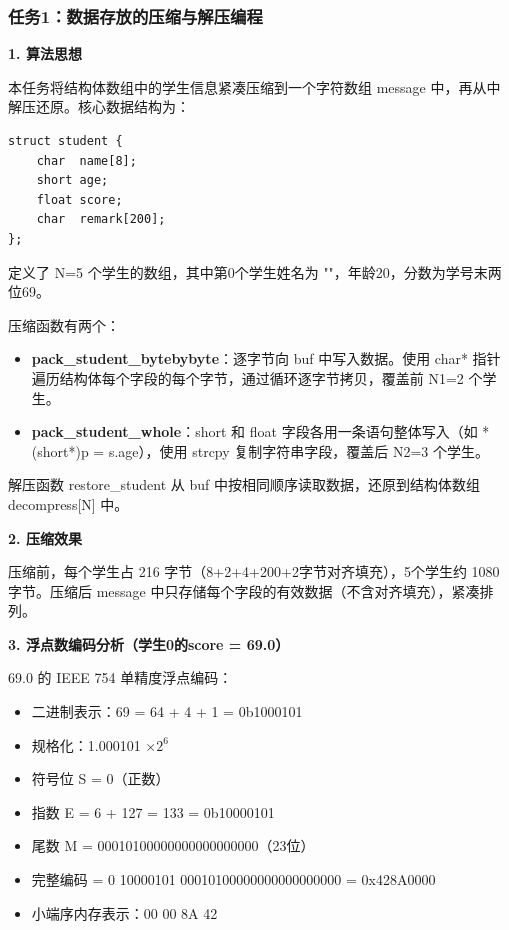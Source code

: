 \subsubsection*{任务1：数据存放的压缩与解压编程}

\textbf{1. 算法思想}

本任务将结构体数组中的学生信息紧凑压缩到一个字符数组 message 中，再从中解压还原。核心数据结构为：

\begin{lstlisting}
struct student {
    char  name[8];
    short age;
    float score;
    char  remark[200];
};
\end{lstlisting}

定义了 N=5 个学生的数组，其中第0个学生姓名为 "\studentname"，年龄20，分数为学号末两位69。

压缩函数有两个：
\begin{itemize}[nosep]
    \item \textbf{pack\_student\_bytebybyte}：逐字节向 buf 中写入数据。使用 char* 指针遍历结构体每个字段的每个字节，通过循环逐字节拷贝，覆盖前 N1=2 个学生。
    \item \textbf{pack\_student\_whole}：short 和 float 字段各用一条语句整体写入（如 *(short*)p = s.age），使用 strcpy 复制字符串字段，覆盖后 N2=3 个学生。
\end{itemize}

解压函数 restore\_student 从 buf 中按相同顺序读取数据，还原到结构体数组 decompress[N] 中。

\textbf{2. 压缩效果}

压缩前，每个学生占 216 字节（8+2+4+200+2字节对齐填充），5个学生约 1080 字节。压缩后 message 中只存储每个字段的有效数据（不含对齐填充），紧凑排列。

\textbf{3. 浮点数编码分析（学生0的score = 69.0）}

69.0 的 IEEE 754 单精度浮点编码：
\begin{itemize}[nosep]
    \item 二进制表示：69 = 64 + 4 + 1 = 0b1000101
    \item 规格化：1.000101 $\times 2^6$
    \item 符号位 S = 0（正数）
    \item 指数 E = 6 + 127 = 133 = 0b10000101
    \item 尾数 M = 00010100000000000000000（23位）
    \item 完整编码 = 0 10000101 00010100000000000000000 = 0x428A0000
    \item 小端序内存表示：00 00 8A 42
\end{itemize}

